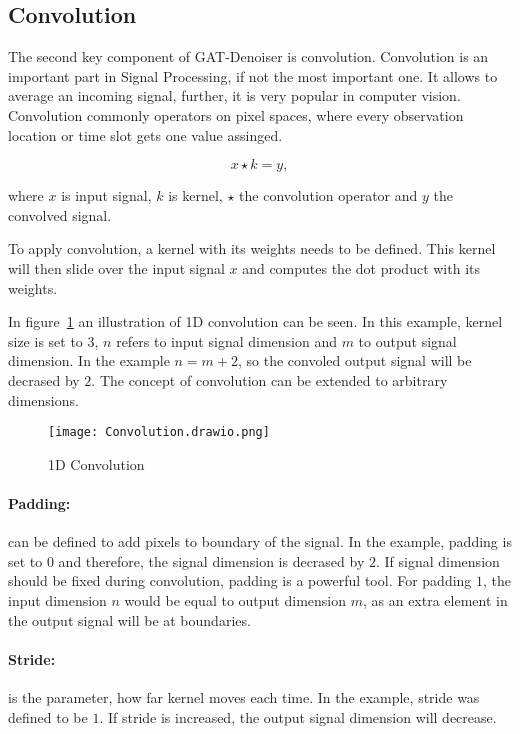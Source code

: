 \subsection{Convolution}
The second key component of GAT-Denoiser is convolution.
Convolution is an important part in Signal Processing, if not the most important one.
It allows to average an incoming signal, further, it is very popular in computer vision.
Convolution commonly operators on pixel spaces, where every observation location or time slot gets one value assinged.

\begin{equation}
  x \star k = y,
\end{equation}

where $x$ is input signal, $k$ is kernel, $\star$ the convolution operator and $y$ the convolved signal.

To apply convolution, a kernel with its weights needs to be defined. 
This kernel will then slide over the input signal $x$ and computes the dot product with its weights.

In figure~\ref{fig:1d-convolution} an illustration of 1D convolution can be seen. In this example,
kernel size is set to 3, $n$ refers to input signal dimension and $m$ to output signal dimension.
In the example  $ n = m + 2$, so the convoled output signal will be decrased by $2$.
The concept of convolution can be extended to arbitrary dimensions.

\begin{figure}[H]
  \centering
  \label{fig:1d-convolution}
  \texttt{[image: Convolution.drawio.png]}
  \caption{1D Convolution}
\end{figure}

\paragraph{Padding:} 
can be defined to add pixels to boundary of the signal.
In the example, padding is set to $0$ and therefore, the signal dimension is decrased by $2$.
If signal dimension should be fixed during convolution, padding is a powerful tool. For padding $1$,
the input dimension $n$ would be equal to output dimension $m$, as an extra element in the output signal
will be at boundaries.


\paragraph{Stride:}
is the parameter, how far kernel moves each time. In the example, stride was defined to be $1$.
If stride is increased, the output signal dimension will decrease.


